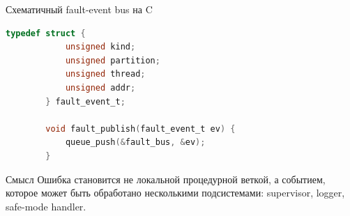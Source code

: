 \begin{frame}[fragile]{Схематичный fault-event bus на C}
	\begin{lstlisting}[language=C]
		typedef struct {
			unsigned kind;
			unsigned partition;
			unsigned thread;
			unsigned addr;
		} fault_event_t;
		
		void fault_publish(fault_event_t ev) {
			queue_push(&fault_bus, &ev);
		}
	\end{lstlisting}
	
	\vspace{0.2cm}
	
	\begin{block}{Смысл}
		Ошибка становится не локальной процедурной веткой, а событием,
		которое может быть обработано несколькими подсистемами:
		supervisor, logger, safe-mode handler.
	\end{block}
\end{frame}
